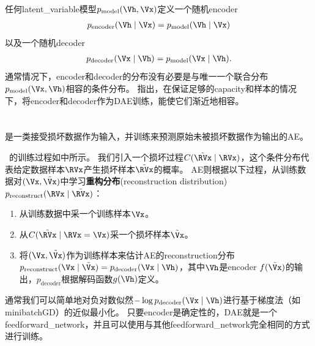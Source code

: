 任何\gls{latent_variable}模型$p_{\text{model}}(\Vh, \Vx)$定义一个随机\gls{encoder}
\begin{align}
p_{\text{encoder}}(\Vh \mid \Vx) = p_{\text{model}}(\Vh\mid\Vx)
\end{align}
以及一个随机\gls{decoder}
\begin{align}
p_{\text{decoder}}(\Vx \mid \Vh) = p_{\text{model}}(\Vx\mid\Vh).
\end{align}
通常情况下，\gls{encoder}和\gls{decoder}的分布没有必要是与唯一一个联合分布$p_{\text{model}}(\Vx, \Vh)$相容的条件分布。
\citet{Alain-et-al-arxiv2015}指出，在保证足够的\gls{capacity}和样本的情况下，将\gls{encoder}和\gls{decoder}作为\gls{DAE}训练，能使它们渐近地相容。



\section{}
\label{sec:denoising_autoencoders}
是一类接受损坏数据作为输入，并训练来预测原始未被损坏数据作为输出的\gls{AE}。


~的训练过程如中所示。
我们引入一个损坏过程$C(\tilde{\RVx} \mid \RVx)$，这个条件分布代表给定数据样本$\RVx$产生损坏样本$\tilde \RVx$的概率。
\gls{AE}则根据以下过程，从训练数据对$(\Vx, \tilde \Vx)$中学习\textbf{重构分布}(reconstruction distribution)~$p_{\text{reconstruct}} (\RVx \mid \tilde \RVx)$：
\begin{enumerate}
\item 从训练数据中采一个训练样本$\Vx$。
\item 从$C(\tilde{\RVx} \mid \RVx=\Vx)$采一个损坏样本$\tilde \Vx$。
\item 将$(\Vx, \tilde \Vx)$作为训练样本来估计\gls{AE}的\gls{reconstruction}分布 
$p_{\text{reconstruct}} (\Vx \mid \tilde \Vx) = p_{\text{decoder}}(\Vx \mid\Vh)$，其中$\Vh$是\gls{encoder} $f(\tilde \Vx)$的输出，$p_{\text{decoder}}$根据解码函数$g(\Vh)$定义。
\end{enumerate}
通常我们可以简单地对负对数似然$-\log p_{\text{decoder}} (\Vx \mid \Vh)$进行基于梯度法（如\gls{minibatch}\gls{GD}）的近似最小化。
只要\gls{encoder}是确定性的，\gls{DAE}就是一个\gls{feedforward_network}，并且可以使用与其他\gls{feedforward_network}完全相同的方式进行训练。

